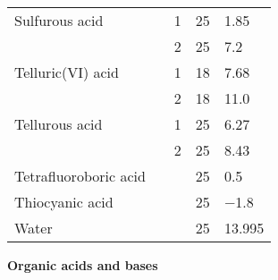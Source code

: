 \documentclass[a4paper, 10pt]{article}
\begin{document}
\begin{footnotesize}
\begin{supertabular}{llccl}
        Sulfurous acid              &    & 1    & 25              & \num{1.85} \\
                                    & \ce{}        & 2    & 25              & \num{7.2} \\
     Telluric(VI) acid              &   & 1    & 18              & \num{7.68} \\
                                    & \ce{}        & 2    & 18              & \num{11.0} \\
        Tellurous acid              &   & 1    & 25              & \num{6.27} \\
                                    & \ce{}        & 2    & 25              & \num{8.43} \\
 Tetrafluoroboric acid              &     &      & 25              & \num{0.5} \\
       Thiocyanic acid              &     &      & 25              & \num{-1.8} \\
                 Water              &      &      & 25              & \num{13.995} \\
    \bottomrule
    \end{supertabular}
\end{footnotesize}

\begin{center}
    \begin{large}
        \textbf{Organic acids and bases}
    \end{large}
\end{center}

\end{document}
